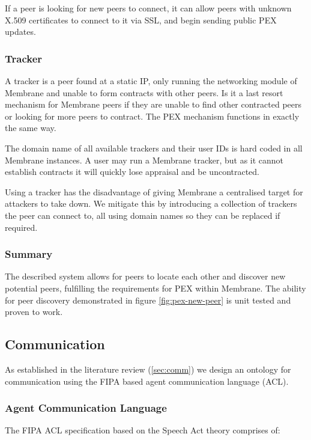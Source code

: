 \documentclass[11pt, a4paper, twoside]{report}
\begin{document}
If a peer is looking for new peers to connect, it can allow peers with unknown X.509 certificates to connect to it via SSL, and begin sending public PEX updates.

\subsubsection{Tracker}

A tracker is a peer found at a static IP, only running the networking module of Membrane and unable to form contracts with other peers. Is it a last resort mechanism for Membrane peers if they are unable to find other contracted peers or looking for more peers to contract. The PEX mechanism functions in exactly the same way.

The domain name of all available trackers and their user IDs is hard coded in all Membrane instances. A user may run a Membrane tracker, but as it cannot establish contracts it will quickly lose appraisal and be uncontracted.

Using a tracker has the disadvantage of giving Membrane a centralised target for attackers to take down. We mitigate this by introducing a collection of trackers the peer can connect to, all using domain names so they can be replaced if required.

\subsubsection{Summary}

The described system allows for peers to locate each other and discover new potential peers, fulfilling the requirements for PEX within Membrane. The ability for peer discovery demonstrated in figure \ref{fig:pex-new-peer} is unit tested and proven to work.

\subsection{Communication}

As established in the literature review (\ref{sec:comm}) we design an ontology for communication using the FIPA based agent communication language (ACL).

\subsubsection{Agent Communication Language}

The FIPA ACL specification based on the Speech Act theory \citep{labrou1999agent} comprises of:
\end{document}
